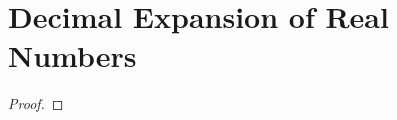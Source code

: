 \section{Decimal Expansion of Real Numbers}
\label{dec}


\addtocounter{exercise}{8}
\Newpage
\begin{exercise} %
	\label{dec:e:9}
	\TBD
\end{exercise}

\begin{proof}
	\TBD
\end{proof}